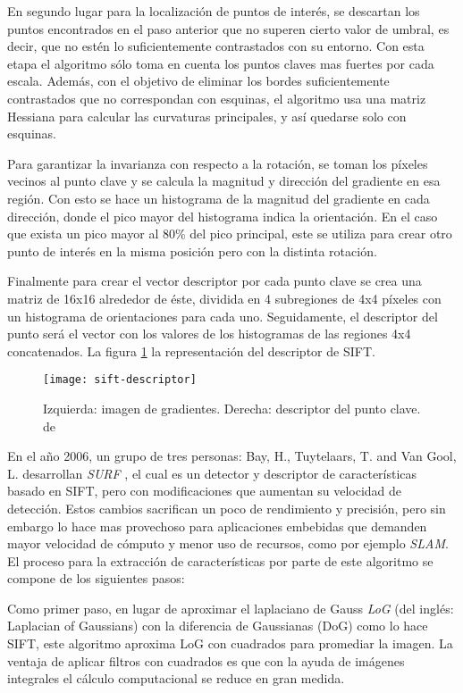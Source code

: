 En segundo lugar para la localización de puntos de interés, se descartan los puntos encontrados en el paso anterior que no superen cierto valor de umbral, es decir, que no estén lo suficientemente contrastados con su entorno. Con esta etapa el algoritmo sólo toma en cuenta los puntos claves mas fuertes por cada escala. Además, con el objetivo de eliminar los bordes suficientemente contrastados que no correspondan con esquinas, el algoritmo usa una matriz Hessiana para calcular las curvaturas principales, y así quedarse solo con esquinas.

Para garantizar la invarianza con respecto a la rotación, se toman los píxeles vecinos al punto clave y se calcula la magnitud y dirección del gradiente en esa región. Con esto se hace un histograma de la magnitud del gradiente en cada dirección, donde el pico mayor del histograma indica la orientación. En el caso que exista un pico mayor al 80\% del pico principal, este se utiliza para crear otro punto de interés en la misma posición pero con la distinta rotación.

Finalmente para crear el vector descriptor por cada punto clave se crea una matriz de 16x16 alrededor de éste, dividida en 4 subregiones de 4x4 píxeles con un histograma de orientaciones para cada uno. Seguidamente, el descriptor del punto será el vector con los valores de los histogramas de las regiones 4x4 concatenados. La figura \ref{imagen:descriptor} la representación del descriptor de SIFT.

\begin{figure}[H]
	\centering
	\texttt{[image: sift-descriptor]}
	\caption[Descriptor SIFT]{Izquierda: imagen de gradientes. Derecha: descriptor del punto clave. de \cite{sift}}
	\label{imagen:descriptor}
\end{figure}


En el año 2006, un grupo de tres personas: Bay, H., Tuytelaars, T. and Van Gool, L. desarrollan \textit{SURF} \cite{surf}, el cual es un detector y descriptor de características basado en SIFT, pero con modificaciones que aumentan su velocidad de detección. Estos cambios sacrifican un poco de rendimiento y precisión, pero sin embargo lo hace mas provechoso para aplicaciones embebidas que demanden mayor velocidad de cómputo y menor uso de recursos, como por ejemplo \textit{SLAM}. El proceso para la extracción de características por parte de este algoritmo se compone de los siguientes pasos:

Como primer paso, en lugar de aproximar el laplaciano de Gauss \textit{LoG} (del inglés: Laplacian of Gaussians) con la diferencia de Gaussianas (DoG) como lo hace SIFT, este algoritmo aproxima LoG con cuadrados para promediar la imagen. La ventaja de aplicar filtros con cuadrados es que con la ayuda de imágenes integrales el cálculo computacional se reduce en gran medida.

